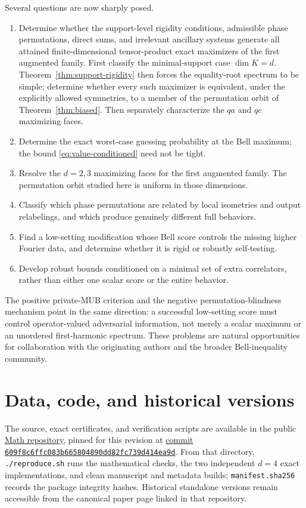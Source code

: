 \documentclass[11pt]{article}
\theoremstyle{definition}
\theoremstyle{remark}
\begin{document}
Several questions are now sharply posed.
\begin{enumerate}[leftmargin=1.6em]
\item Determine whether the support-level rigidity conditions, admissible
phase permutations, direct sums, and irrelevant ancillary systems generate
all attained finite-dimensional tensor-product exact maximizers of the first
augmented family.  First classify the minimal-support case \(\dim K=d\).
Theorem~\ref{thm:support-rigidity} then forces the equality-root spectrum to
be simple; determine whether every such maximizer is equivalent, under the
explicitly allowed symmetries, to a member of the permutation orbit of
Theorem~\ref{thm:biased}.  Then separately characterize the \(qa\) and \(qc\)
maximizing faces.
\item Determine the exact worst-case guessing probability at the Bell maximum;
the bound \eqref{eq:value-conditioned} need not be tight.
\item Resolve the \(d=2,3\) maximizing faces for the first augmented family.
The permutation orbit studied here is uniform in those dimensions.
\item Classify which phase permutations are related by local isometries and
output relabelings, and which produce genuinely different full behaviors.
\item Find a low-setting modification whose Bell score controls the missing
higher Fourier data, and determine whether it is rigid or robustly
self-testing.
\item Develop robust bounds conditioned on a minimal set of extra correlators,
rather than either one scalar score or the entire behavior.
\end{enumerate}
The positive private-MUB criterion and the negative permutation-blindness
mechanism point in the same direction: a successful low-setting score must
control operator-valued adversarial information, not merely a scalar maximum
or an unordered first-harmonic spectrum.
These problems are natural opportunities for collaboration with the
originating authors and the broader Bell-inequality community.

\section*{Data, code, and historical versions}

The source, exact certificates, and verification scripts are available in the
public \href{https://github.com/AlecKriebel/Math}{Math repository}, pinned for
this revision at
\href{https://github.com/AlecKriebel/Math/tree/609f8c6ffc083b665804890dd82fc739d414ea9d/cyclic_bell_exact_values_and_randomness}
{commit \texttt{609f8c6ffc083b665804890dd82fc739d414ea9d}}.
From that directory, \texttt{./reproduce.sh} runs the mathematical checks,
the two independent \(d=4\) exact implementations, and clean manuscript and
metadata builds; \texttt{manifest.sha256} records the package integrity
hashes.  Historical standalone versions remain accessible from the canonical
paper page linked in that repository.
\end{document}
